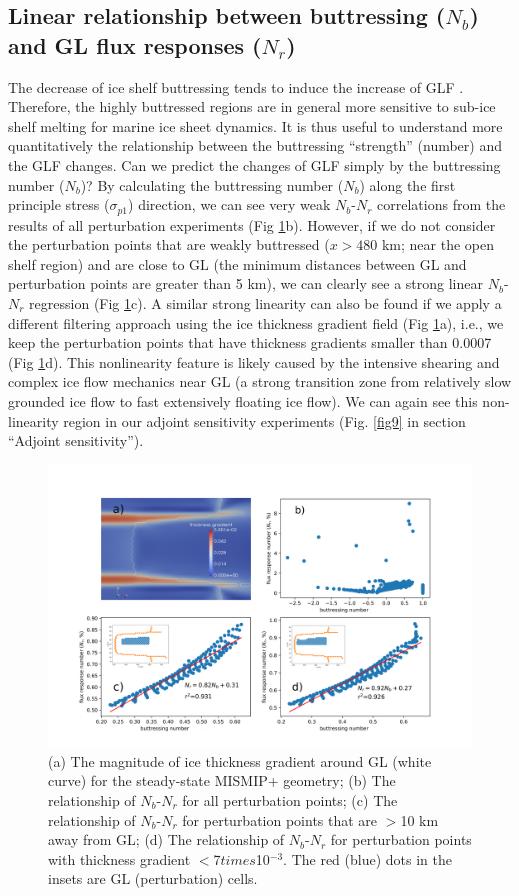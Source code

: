 \documentclass[review,oneside]{igs}
\begin{document}
\subsection{Linear relationship between buttressing ($N_b$) and GL flux responses ($N_r$)}
The decrease of ice shelf buttressing tends to induce the increase of GLF \citep{gagliardini2010}. Therefore, the highly buttressed regions are in general more sensitive to sub-ice shelf melting for  marine ice sheet dynamics. It is thus useful to understand more quantitatively the relationship between the buttressing ``strength'' (number) and the GLF  changes. Can we predict the changes of GLF simply by the buttressing number ($N_b$)? By calculating the buttressing number ($N_b$) along the first principle stress ($\sigma_{p1}$) direction, we can see very weak $N_b$-$N_r$ correlations from the results of all perturbation experiments (Fig \ref{fig2}b). However, if we do not consider the perturbation points that are weakly buttressed ($x>480$ km; near the open shelf region) and are close to GL (the minimum distances between GL and perturbation points are greater than 5 km), we can clearly see a strong linear $N_b$-$N_r$ regression (Fig \ref{fig2}c). A similar strong linearity can also be found if we apply a different filtering approach using the ice thickness gradient field (Fig \ref{fig2}a), i.e., we keep the perturbation points that have thickness gradients smaller than 0.0007 (Fig \ref{fig2}d). This nonlinearity feature is likely caused by the intensive shearing and complex ice flow mechanics near GL (a strong transition zone from relatively slow grounded ice flow to fast extensively floating ice flow). We can again see this non-linearity region in our adjoint sensitivity experiments (Fig. \ref{fig9} in section ``Adjoint sensitivity'').

\begin{figure}
\centering
\includegraphics[width=1\linewidth]{figs/fig2.pdf}
    \caption{(a) The magnitude of ice thickness gradient around GL (white curve) for the steady-state MISMIP+ geometry; (b) The relationship of $N_b$-$N_r$ for all perturbation points; (c) The relationship of $N_b$-$N_r$ for perturbation points that are $>$10 km away from GL; (d) The relationship of $N_b$-$N_r$ for perturbation points with thickness gradient $<$7$times$10$^{-3}$. The red (blue) dots in the insets are GL (perturbation) cells.}
\label{fig2}
\end{figure}
\end{document}
